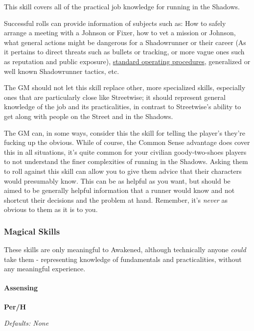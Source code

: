 \begin{multicols}{3}
	This skill covers all of the practical job knowledge for running in the Shadows. 
	
	Successful rolls can provide information of subjects such as: How to safely arrange a meeting with a Johnson or Fixer, how to vet a mission or Johnson, what general actions might be dangerous for a Shadowrunner or their career (As it pertains to direct threats such as bullets or tracking, or more vague ones such as reputation and public exposure), \textcolor{Blue}{\href{https://docs.google.com/document/d/1ydfYWrtSEOtMoSOpVesdoS2iJw_fOHHDZA1RMCXlY8Y/edit?usp=drivesdk}{standard operating procedures}}, generalized or well known Shadowrunner tactics, etc.
	
	The GM should not let this skill replace other, more specialized skills, especially ones that are particularly close like Streetwise; it should represent general knowledge of the job and its practicalities, in contrast to Streetwise's ability to get along with people on the Street and in the Shadows.
	
	The GM can, in some ways, consider this the skill for telling the player's they're fucking up the obvious. While of course, the Common Sense advantage does cover this in all situations, it's quite common for your civilian goody-two-shoes players to not understand the finer complexities of running in the Shadows. Asking them to roll against this skill can allow you to give them advice that their characters would presumably know. This can be as helpful as you want, but should be aimed to be generally helpful information that a runner would know and not shortcut their decisions and the problem at hand. Remember, it's \textit{never} as obvious to them as it is to you.
	
	\subsubsection*{Magical Skills}
	
	These skills are only meaningful to Awakened, although technically anyone \textit{could} take them - representing knowledge of fundamentals and practicalities, without any meaningful experience.
	
	\paragraph{Assensing}\label{assensing_skill}
	\begin{flushright}
		\textbf{Per/H}
	\end{flushright}
	\textcolor{NavyBlue}{\textit{Defaults: None}}
	

\end{multicols}
